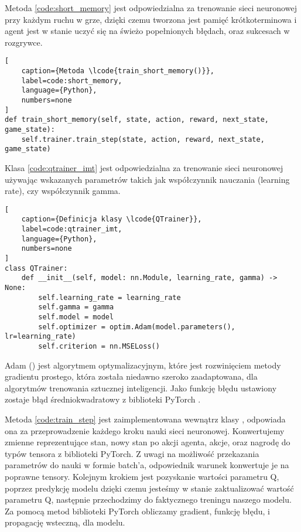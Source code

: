 Metoda  \ref{code:short_memory} jest odpowiedzialna za trenowanie sieci neuronowej przy każdym ruchu w grze, dzięki czemu tworzona jest pamięć krótkoterminowa i agent jest w stanie uczyć się na świeżo popełnionych błędach, oraz sukcesach w rozgrywce.

\begin{onepage}
    \begin{lstlisting}[
    caption={Metoda \lcode{train_short_memory()}},
    label=code:short_memory,
    language={Python},
    numbers=none
]
def train_short_memory(self, state, action, reward, next_state, game_state):
    self.trainer.train_step(state, action, reward, next_state, game_state)

    \end{lstlisting}
\end{onepage}

Klasa  \ref{code:qtrainer_imt} jest odpowiedzialna za trenowanie sieci neuronowej używając wskazanych parametrów takich jak współczynnik nauczania (learning rate), czy współczynnik gamma.

\begin{onepage}
    \begin{lstlisting}[
    caption={Definicja klasy \lcode{QTrainer}},
    label=code:qtrainer_imt,
    language={Python},
    numbers=none
]
class QTrainer:
    def __init__(self, model: nn.Module, learning_rate, gamma) -> None:
        self.learning_rate = learning_rate
        self.gamma = gamma
        self.model = model
        self.optimizer = optim.Adam(model.parameters(), lr=learning_rate)
        self.criterion = nn.MSELoss()
    \end{lstlisting}
\end{onepage}


Adam () \cite{AdamOpt1} \cite{AdamOpt2} jest algorytmem optymalizacyjnym, które jest rozwinięciem metody gradientu prostego, która została niedawno szeroko zaadaptowana, dla algorytmów trenowania sztucznej inteligencji. Jako funkcję błędu ustawiony zostaje błąd średniokwadratowy z biblioteki PyTorch .

\clearpage

Metoda  \ref{code:train_step} jest zaimplementowana wewnątrz klasy , odpowiada ona za przeprowadzenie każdego kroku nauki sieci neuronowej. Konwertujemy zmienne reprezentujące stan, nowy stan po akcji agenta, akcje, oraz nagrodę do typów tensora z biblioteki PyTorch. Z uwagi na możliwość przekazania parametrów do nauki w formie batch'a, odpowiednik warunek konwertuje je na poprawne tensory. Kolejnym krokiem jest pozyskanie wartości parametru Q, poprzez predykcję modelu dzięki czemu jesteśmy w stanie zaktualizować wartość parametru Q, następnie przechodzimy do faktycznego treningu naszego modelu. Za pomocą metod biblioteki PyTorch obliczamy gradient, funkcję błędu, i propagację wsteczną, dla modelu.

